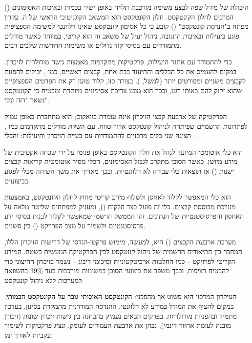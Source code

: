 

היכולת של מודל שפה לבצע משימה מורכבת תלויה באופן ישיר בכמות ובאיכות האסימונים () המוזנים לחלון הקונטקסט. חלון הקונטקסט הוא המשאב הקוגניטיבי הראשי של ה. עקרון מפתח ב"הנדסת קונטקסט" () קובע כי כל אסימון קונטקסט שאינו רלוונטי למשימה הספציפית פוגע ביעילות ובאיכות התגובה. ניהול יעיל של משאב זה הוא קריטי, במיוחד כאשר מודלים מתמודדים עם בסיסי קוד גדולים או משימות הדורשות שלבים רבים.

כדי להתמודד עם אתגר היעילות, פרקטיקות מתקדמות מאמצות גישה מודולרית לזיכרון. במקום להעמיס את כל הכללים והתיעוד בבת אחת, קבצים ראשיים, כמו , יכולים להפנות לקבצים משניים ומפורטים יותר (למשל, ). בצורה כזו, קלוד טוען רק את הפרטים הספציפיים שהוא זקוק להם באותו רגע, ובכך הוא מונע צריכת אסימונים מיותרת ומבטיח כי הקונטקסט נשאר "רזה ונקי".


הפרקטיקה של ארבעת קבצי הזיכרון אינה עומדת בוואקום; היא מתחברת באופן עמוק לפתרונות הרשמיים שפיתחה  לניהול קונטקסט ארוך-טווח. עם השקת מודלים מתקדמים כמו ,  הציגה שני כלים מרכזיים להתמודדות עם בעיית הזיכרון והיעילות:  והכלי .

\textbf{} הוא כלי אוטומטי המיועד לנהל את חלון הקונטקסט באופן פנימי על ידי שכחה אקטיבית של מידע מיושן. כאשר הסוכן מתקרב לגבול האסימונים, הכלי מסיר אוטומטית קריאות קבצים ישנות () או תוצאות כלי עבודה לא רלוונטיות, ובכך מאריך את משך השיחה מבלי לפגוע בביצועים.

\textbf{} הוא כלי המאפשר לקלוד לאחסן ולשלוף מידע קריטי מחוץ לחלון הקונטקסט, באמצעות מערכת מבוססת קבצים. כלי זה פועל בצד הלקוח (), ומעניק למפתחים שליטה מלאה על האחסון והפרסיסטנטיות של הנתונים. זהו הממשק הרשמי שמאפשר לקלוד לבנות בסיסי ידע פרסיסטנטיים ולשמור על מצב הפרויקט () בין סשנים.

מערכת ארבעת הקבצים () היא, למעשה, מימוש פרקטי-הנדסי של דרישות הזיכרון הללו, המחבר בין התיאוריה הרשמית של ניהול קונטקסט לבין הפרקטיקה המעשית בשטח. המידע הקריטי לפרויקט – כמו החלטות ארכיטקטוניות וסיכומי דיבוג – נשמר בזיכרון החיצוני כדי להבטיח רציפות, ובכך משפר את ביצועי הסוכן במשימות מורכבות בעד \num{39}\% בהשוואה למערכות ללא ניהול קונטקסט.

העיקרון המרכזי הוא פשוט אך מהפכני: \textbf{הקונטקסט האיכותי גובר על הקונטקסט הכמותי}. במקום להציף את המודל במידע לא רלוונטי, ההנדסה המודרנית מתמקדת בסינון, בעדכון מתמיד ובהפניות מודולריות. בפרקים הבאים נעמיק בהבחנה בין גישות זיכרון שונות (זיכרון מובנה לעומת אחזור דינמי), נבחן את ארבעת העמודים לעומק, ונציג פרקטיקות לשימור עקביות לאורך זמן.
